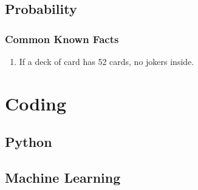 \documentclass{article}
\begin{document}
\subsection{Probability}
\subsubsection{Common Known Facts}
\begin{enumerate}
    \item If a deck of card has 52 cards, no jokers inside.
\end{enumerate}



\newpage
\section{Coding}
\subsection{Python}

\newpage
\subsection{Machine Learning}
\end{document}
